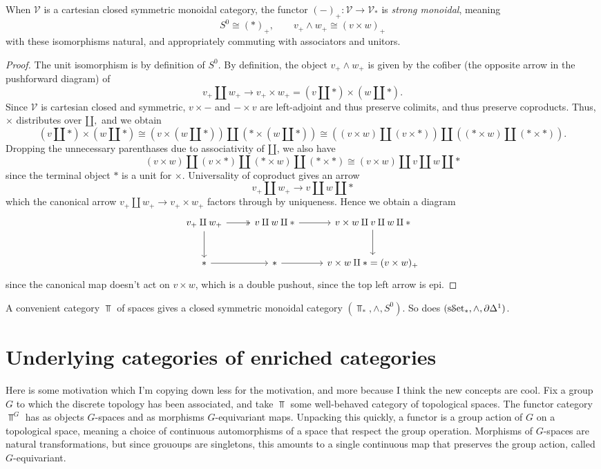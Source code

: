 \begin{lemma}\label{lma:3.1}
	When $\mathcal{V} $ is a cartesian closed symmetric monoidal category, the functor $(-)_+ : \mathcal{V}  \to \mathcal{V} _*$ is \emph{strong monoidal}, meaning
	\[
		S^0\cong(*)_+,\qquad v_+\wedge w_+\cong(v\times w)_+
	\]
	with these isomorphisms natural, and appropriately commuting with associators and unitors.
\end{lemma}
\begin{proof}
	The unit isomorphism is by definition of $S^0$. By definition, the object $v_+\wedge w_+$ is given by the cofiber (the opposite arrow in the pushforward diagram) of
	\[
	v_+\amalg w_+ \to v_+\times w_+=(v\amalg *)\times (w\amalg *)
	.\]
	Since $\mathcal{V} $ is cartesian closed and symmetric, $v\times -$ and $-\times v$ are left-adjoint and thus preserve colimits, and thus preserve coproducts. Thus, $\times $ distributes over $\amalg,$ and we obtain
	\[
		(v\amalg *)\times (w\amalg *)\cong (v\times (w\amalg *))\amalg(*\times(w\amalg*))\cong((v\times w)\amalg(v\times *))\amalg((*\times w)\amalg(*\times *))
	.\]
	Dropping the unnecessary parenthases due to associativity of $\amalg$, we also have
	\[
		(v\times w)\amalg(v\times *)\amalg(*\times w)\amalg(*\times *)\cong(v\times w)\amalg v\amalg w\amalg *
	\]
	since the terminal object $*$ is a unit for $\times $. Universality of coproduct gives an arrow
	\[
		v_+\amalg w_+ \to v\amalg w\amalg*
	\]
	which the canonical arrow $v_+\amalg w_+\to v_+\times w_+$ factors through by uniqueness. Hence we obtain a diagram
	\[\begin{tikzcd}[row sep = 2.5em, column sep = 2.5em]
	v_+\amalg w_+\ar[two heads, r] \ar[d]  & v\amalg w\amalg *\ar[r]  & v\times w\amalg v\amalg w\amalg *\ar[d]  \\
	*\ar[r]  & *\ar[r]  & v\times w\amalg *=(v\times w)_+
	\end{tikzcd}\]
	since the canonical map doesn't act on $v\times w$, which is a double pushout, since the top left arrow is epi.
\end{proof}

A convenient category $\Top $ of spaces gives a closed symmetric monoidal category $(\Top _*,\wedge,S^0)$. So does $(\mathrm{s}\mathcal{S}\mathrm{et}_*,\wedge,\partial \Delta^1)$.

\section{Underlying categories of enriched categories}

Here is some motivation which I'm copying down less for the motivation, and more because I think the new concepts are cool. Fix a group $G$ to which the discrete topology has been associated, and take $\Top $ some well-behaved category of topological spaces. The functor category $\Top ^G$ has as objects $G$-spaces and as morphisms $G$-equivariant maps. Unpacking this quickly, a functor is a group action of $G$ on a topological space, meaning a choice of continuous automorphisms of a space that respect the group operation. Morphisms of $G$-spaces are natural transformations, but since grououps are singletons, this amounts to a single continuous map that preserves the group action, called $G$-equivariant.

